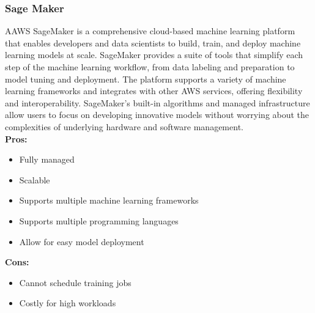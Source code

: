         \subsubsection{Sage Maker}
        \label{aws:sage-maker}
        AAWS SageMaker is a comprehensive cloud-based machine learning platform that enables developers and data scientists to build, train, and deploy machine learning models at scale. SageMaker provides a suite of tools that simplify each step of the machine learning workflow, from data labeling and preparation to model tuning and deployment. The platform supports a variety of machine learning frameworks and integrates with other AWS services, offering flexibility and interoperability. SageMaker's built-in algorithms and managed infrastructure allow users to focus on developing innovative models without worrying about the complexities of underlying hardware and software management.\\
        \textbf{Pros:}
        \begin{itemize}
            \item Fully managed
            \item Scalable
            \item Supports multiple machine learning frameworks
            \item Supports multiple programming languages
            \item Allow for easy model deployment
        \end{itemize}
        \textbf{Cons:}
        \begin{itemize}
            \item Cannot schedule training jobs
            \item Costly for high workloads
        \end{itemize}

